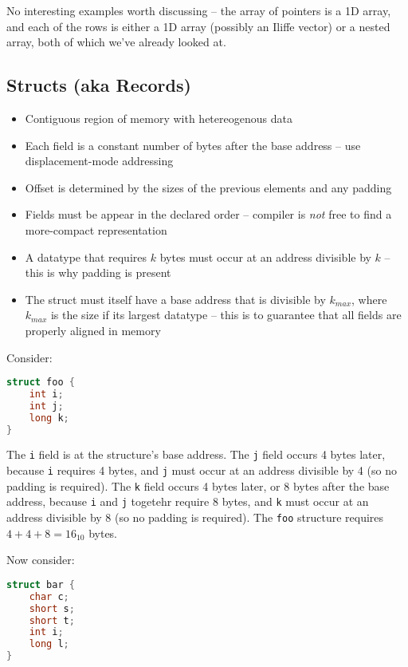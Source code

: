 \documentclass{article}
\begin{document}
No interesting examples worth discussing -- the array of pointers is a 1D array, and each of the rows is either a 1D array (possibly an Iliffe vector) or a nested array, both of which we've already looked at.

\subsection{Structs (aka Records)}

\begin{itemize}
\item Contiguous region of memory with hetereogenous data
\item Each field is a constant number of bytes after the base address -- use displacement-mode addressing
\item Offset is determined by the sizes of the previous elements and any padding
\item Fields must be appear in the declared order -- compiler is \textit{not} free to find a more-compact representation
\item A datatype that requires $k$ bytes must occur at an address divisible by $k$ -- this is why padding is present
\item The struct must itself have a base address that is divisible by $k_{max}$, where $k_{max}$ is the size if its largest datatype -- this is to guarantee that all fields are properly aligned in memory
\end{itemize}

Consider:

\begin{lstlisting}[language=C]
struct foo {
    int i;
    int j;
    long k;
}
\end{lstlisting}

The \lstinline{i} field is at the structure's base address.
The \lstinline{j} field occurs 4 bytes later, because \lstinline{i} requires 4 bytes, and \lstinline{j} must occur at an address divisible by 4 (so no padding is required).
The \lstinline{k} field occurs 4 bytes later, or 8 bytes after the base address, because \lstinline{i} and \lstinline{j} togetehr require 8 bytes, and \lstinline{k} must occur at an address divisible by 8 (so no padding is required).
The \lstinline{foo} structure requires $4+4+8=16_{10}$ bytes.

Now consider:

\begin{lstlisting}[language=C]
struct bar {
    char c;
    short s;
    short t;
    int i;
    long l;
}
\end{lstlisting}
\end{document}
